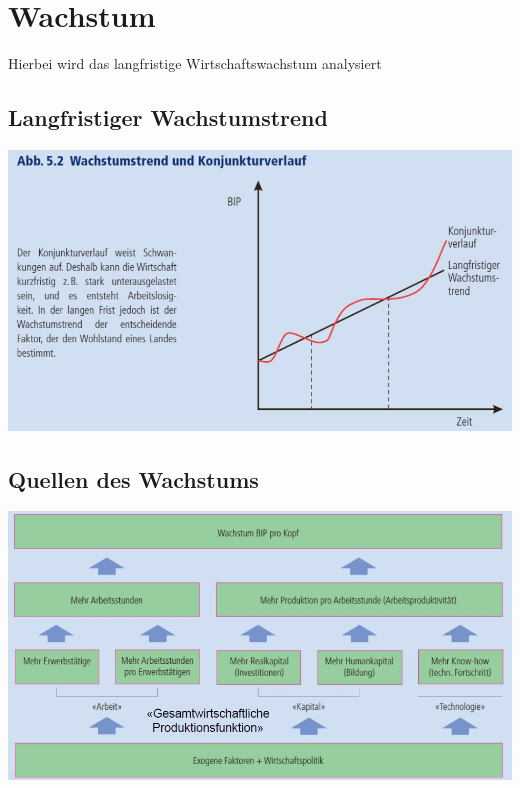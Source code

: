 \section{Wachstum}
Hierbei wird das langfristige Wirtschaftswachstum analysiert
\subsection{Langfristiger Wachstumstrend}
\includegraphics[width=0.8\linewidth]{images/wachstum.jpg}
\subsection{Quellen des Wachstums}
\includegraphics[width=0.8\linewidth]{images/quellen.jpg}